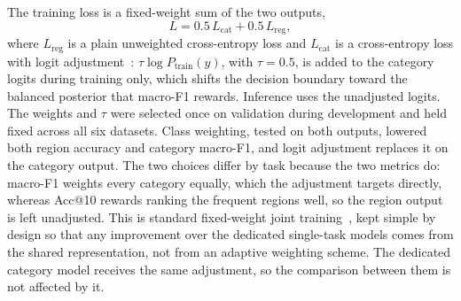 The training loss is a fixed-weight sum of the two outputs,
\begin{equation}\label{eq:mobiwac:loss}
L = 0.5\,L_{\mathrm{cat}} + 0.5\,L_{\mathrm{reg}},
\end{equation}
where $L_{\mathrm{reg}}$ is a plain unweighted cross-entropy loss and $L_{\mathrm{cat}}$ is a
cross-entropy loss with logit adjustment~\cite{menon2021logitadjustment}: $\tau\log P_{\mathrm{train}}(y)$, with $\tau=0.5$, is added
to the category logits during training only, which shifts the decision boundary toward the balanced
posterior that macro-F1 rewards. Inference uses the unadjusted logits. The weights and $\tau$ were
selected once on validation during development and held fixed across all six datasets. Class
weighting, tested on both outputs, lowered both region accuracy and category macro-F1, and logit
adjustment replaces it on the category output. The two choices differ by task because the two
metrics do: macro-F1 weights every category equally, which the adjustment targets directly, whereas
Acc@10 rewards ranking the frequent regions well, so the region output is left unadjusted. This is
standard fixed-weight joint training~\cite{caruana1997multitask}, kept simple by design so that any
improvement over the dedicated single-task models comes from the shared representation, not from an
adaptive weighting scheme. The dedicated category model receives the same adjustment, so the
comparison between them is not affected by it.

